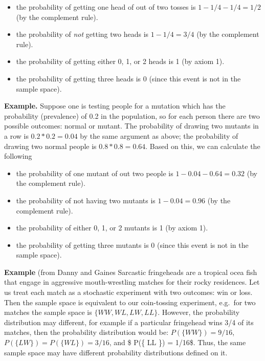 \documentclass[
  letterpaper,
  DIV=11,
  numbers=noendperiod]{scrreprt}
\providecommand{\tightlist}{%
  \setlength{\itemsep}{0pt}\setlength{\parskip}{0pt}}\usepackage{longtable,booktabs,array}
\begin{document}
\begin{itemize}
\tightlist
\item
  the probability of getting one head of out of two tosses is
  \(1-1/4-1/4=1/2\) (by the complement rule).
\item
  the probability of \emph{not} getting two heads is \(1-1/4 = 3/4\) (by
  the complement rule).\\
\item
  the probability of getting either 0, 1, or 2 heads is 1 (by axiom 1).
\item
  the probability of getting three heads is 0 (since this event is not
  in the sample space).
\end{itemize}

\textbf{Example.} Suppose one is testing people for a mutation which has
the probability (prevalence) of 0.2 in the population, so for each
person there are two possible outcomes: normal or mutant. The
probability of drawing two mutants in a row is \(0.2*0.2=0.04\) by the
same argument as above; the probability of drawing two normal people is
\(0.8*0.8 =0.64\). Based on this, we can calculate the following

\begin{itemize}
\tightlist
\item
  the probability of one mutant of out two people is
  \(1-0.04-0.64=0.32\) (by the complement rule).
\item
  the probability of not having two mutants is \(1-0.04 = 0.96\) (by the
  complement rule).\\
\item
  the probability of either 0, 1, or 2 mutants is 1 (by axiom 1).
\item
  the probability of getting three mutants is 0 (since this event is not
  in the sample space).
\end{itemize}

\textbf{Example} (from Danny and Gaines Sarcastic fringeheads are a
tropical ocea fish that engage in aggressive mouth-wrestling matches for
their rocky residences. Let us treat each match as a stochastic
experiment with two outcomes: win or loss. Then the sample space is
equivalent to our coin-tossing experiment, e.g.~for two matches the
sample space is \(\{ WW, WL, LW, LL \}\). However, the probability
distribution may different, for example if a particular fringehead wins
3/4 of its matches, then the probability distribution would be:
\(P(\{ WW \}) = 9/16\), \(P(\{ LW \}) = P(\{ WL \}) = 3/16\), and \$
P(\{ LL \}) = 1/16\$. Thus, the same sample space may have different
probability distributions defined on it.
\end{document}
